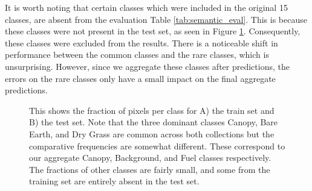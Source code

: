 It is worth noting that certain classes which were included in the original 15 classes, are absent from the evaluation Table \ref{tab:semantic_eval}. This is because these classes were not present in the test set, as seen in Figure \ref{fig:class_frac}.
Consequently, these classes were excluded from the results. There is a noticeable shift in performance between the common classes and the rare classes, which is unsurprising. However, since we aggregate these classes after predictions, the errors on the rare classes only have a small impact on the final aggregate predictions.

\begin{figure}[h!]
   \centering
   \caption{This shows the fraction of pixels per class for A) the train set and B) the test set. Note that the three dominant classes Canopy, Bare Earth, and Dry Grass are common across both collections but the comparative frequencies are somewhat different. These correspond to our aggregate Canopy, Background, and Fuel classes respectively. The fractions of other classes are fairly small, and some from the training set are entirely absent in the test set.}
   \label{fig:class_frac}                %
\end{figure}


